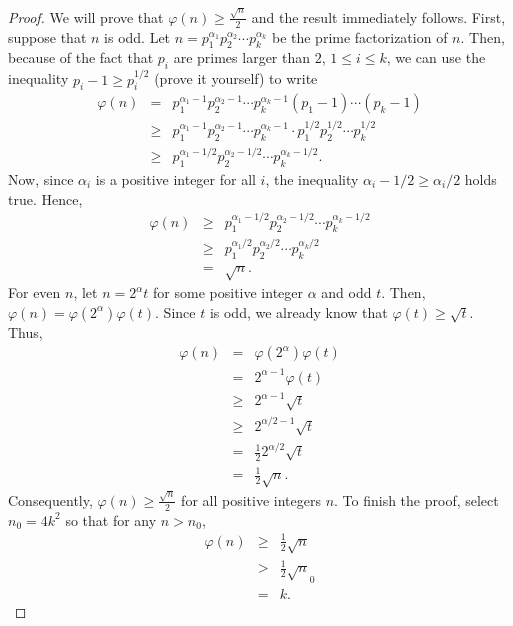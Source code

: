 \documentclass[12pt]{subfile}
\begin{document}
		\begin{proof}
			We will prove that $\varphi(n) \geq \frac{\sqrt{n}}{2}$ and the result immediately follows. First, suppose that $n$ is odd. Let $n=p_1^{\alpha_1} p_2^{\alpha_2} \cdots p_k^{\alpha_k}$ be the prime factorization of $n$. Then, because of the fact that $p_i$ are primes larger than $2$, $1 \leq i \leq k$, we can use the inequality $p_i-1 \geq p_i^{1/2}$ (prove it yourself) to write
				\begin{eqnarray*}
					\varphi(n) &=& p_1^{\alpha_1-1} p_2^{\alpha_2-1} \cdots p_k^{\alpha_k-1} \left( p_1 -1 \right) \cdots \left( p_k -1 \right)\\
							   &\geq& p_1^{\alpha_1-1} p_2^{\alpha_2-1} \cdots p_k^{\alpha_k-1} \cdot p_1^{1/2} p_2^{1/2} \cdots p_k^{1/2}\\
							   &\geq& p_1^{\alpha_1-1/2} p_2^{\alpha_2-1/2} \cdots p_k^{\alpha_k-1/2}.
				\end{eqnarray*}
			Now, since $\alpha_i$ is a positive integer for all $i$, the inequality $\alpha_i - 1/2 \geq \alpha_i/2$ holds true. Hence,
				\begin{eqnarray*}
					\varphi(n)  &\geq& p_1^{\alpha_1-1/2} p_2^{\alpha_2-1/2} \cdots p_k^{\alpha_k-1/2}\\
								&\geq& p_1^{\alpha_1/2} p_2^{\alpha_2/2} \cdots p_k^{\alpha_k/2}\\
								&=& \sqrt n.
				\end{eqnarray*}
			For even $n$, let $n=2^\alpha t$ for some positive integer $\alpha$ and odd $t$. Then, $\varphi(n)=\varphi(2^\alpha)\varphi(t)$. Since $t$ is odd, we already know that $\varphi(t) \geq \sqrt t$. Thus,
				\begin{eqnarray*}
					\varphi(n) &=& \varphi(2^\alpha)\varphi(t)\\
							   &=& 2^{\alpha -1} \varphi(t)\\
							   &\geq& 2^{\alpha -1} \sqrt t\\
							   &\geq& 2^{\alpha/2 -1} \sqrt t\\
							   &=& \frac{1}{2}2^{\alpha/2} \sqrt t\\
							   &=& \frac{1}{2} \sqrt n.
				\end{eqnarray*}
			Consequently, $\varphi(n) \geq \frac{\sqrt n}{2}$ for all positive integers $n$. To finish the proof, select $n_0=4k^2$ so that for any $n>n_0$,
				\begin{eqnarray*}
					\varphi(n) &\geq& \frac{1}{2} \sqrt n\\
							   &>& \frac{1}{2} \sqrt n_0\\
							   &=& k.
				\end{eqnarray*}
		\end{proof}
		
\end{document}
